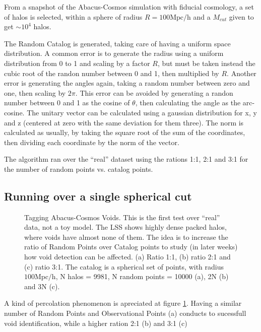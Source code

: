 \documentclass[preprint]{aastex62}
\begin{document}
From a snapshot of the Abacus-Cosmos simulation with fiducial cosmology, a set of
halos is selected, within a sphere of radius $R=100\mathrm{Mpc/h}$ and a $M_{cut}$
given to get $\sim 10^4$ halos.

The Random Catalog is generated, taking care of having a uniform space
distribution. A common error is to generate the radius using a uniform
distribution from 0 to 1 and scaling by a factor $R$,
but must be taken instead the cubic root of the randon number between 0 and 1,
then multiplied by $R$. Another error is generating the angles again, taking a
random number between zero and one, then scaling by $2\pi$. This error can be
avoided by generating a randon number between 0 and 1 as the cosine of $\theta$,
then calculating the angle as the arc-cosine. The unitary vector can be
calculated using a gaussian distribution for x, y and z (centered at zero
with the same deviation for them three).  %
The norm is calculated as usually, by taking the square root of the sum of
the coordinates, then dividing each coordinate by the norm of the vector.

The algorithm ran over the ``real'' dataset using the rations 1:1, 2:1
and 3:1 for the number of random points vs. catalog points.

\subsection{Running over a single spherical cut}

\begin{figure}
  \caption{Tagging Abacus-Cosmos Voids. This is the first test over ``real''
    data, not a toy model. The LSS shows highly dense packed halos, where
    voids have almost none of them. The idea is to increase the ratio of
    Random Points over Catalog points to study (in later weeks) how void
    detection can be affected. (a) Ratio 1:1, (b) ratio 2:1 and (c) ratio 3:1.
    The catalog is a spherical set of points, with radius $100 \mathrm{Mpc/h}$,
    N halos = 9981, N random points = 10000 (a), 2N (b) and 3N (c).
    \label{fig:Tagging Abacus Cosmos Voids}}
\end{figure}

A kind of percolation phenomenon is apreciated at figure
\ref{fig:Tagging Abacus Cosmos Voids}. Having a similar number of Random Points
and Observational Points (a) conducts to sucessfull void identification, while
a higher ration 2:1 (b) and 3:1 (c) 
\end{document}
